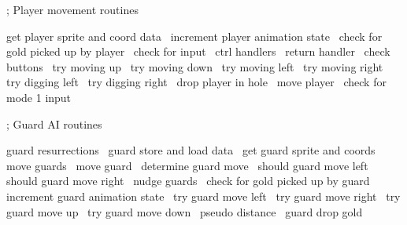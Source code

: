 \documentclass[10pt]{report}%
\begin{document}
    ; Player movement routines

    \LA{}get player sprite and coord data~{\nwtagstyle{}}\RA{}
    \LA{}increment player animation state~{\nwtagstyle{}}\RA{}
    \LA{}check for gold picked up by player~{\nwtagstyle{}}\RA{}
    \LA{}check for input~{\nwtagstyle{}}\RA{}
    \LA{}ctrl handlers~{\nwtagstyle{}}\RA{}
    \LA{}return handler~{\nwtagstyle{}}\RA{}
    \LA{}check buttons~{\nwtagstyle{}}\RA{}
    \LA{}try moving up~{\nwtagstyle{}}\RA{}
    \LA{}try moving down~{\nwtagstyle{}}\RA{}
    \LA{}try moving left~{\nwtagstyle{}}\RA{}
    \LA{}try moving right~{\nwtagstyle{}}\RA{}
    \LA{}try digging left~{\nwtagstyle{}}\RA{}
    \LA{}try digging right~{\nwtagstyle{}}\RA{}
    \LA{}drop player in hole~{\nwtagstyle{}}\RA{}
    \LA{}move player~{\nwtagstyle{}}\RA{}
    \LA{}check for mode 1 input~{\nwtagstyle{}}\RA{}

    ; Guard AI routines

    \LA{}guard resurrections~{\nwtagstyle{}}\RA{}
    \LA{}guard store and load data~{\nwtagstyle{}}\RA{}
    \LA{}get guard sprite and coords~{\nwtagstyle{}}\RA{}
    \LA{}move guards~{\nwtagstyle{}}\RA{}
    \LA{}move guard~{\nwtagstyle{}}\RA{}
    \LA{}determine guard move~{\nwtagstyle{}}\RA{}
    \LA{}should guard move left~{\nwtagstyle{}}\RA{}
    \LA{}should guard move right~{\nwtagstyle{}}\RA{}
    \LA{}nudge guards~{\nwtagstyle{}}\RA{}
    \LA{}check for gold picked up by guard~{\nwtagstyle{}}\RA{}
    \LA{}increment guard animation state~{\nwtagstyle{}}\RA{}
    \LA{}try guard move left~{\nwtagstyle{}}\RA{}
    \LA{}try guard move right~{\nwtagstyle{}}\RA{}
    \LA{}try guard move up~{\nwtagstyle{}}\RA{}
    \LA{}try guard move down~{\nwtagstyle{}}\RA{}
    \LA{}pseudo distance~{\nwtagstyle{}}\RA{}
    \LA{}guard drop gold~{\nwtagstyle{}}\RA{}
\end{document}
